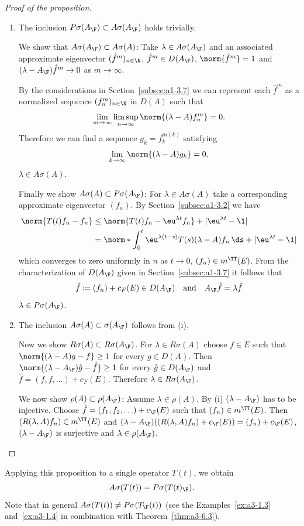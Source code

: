 \begin{proof}[Proof of the proposition]
\begin{enumerate}[\upshape (i), wide, labelindent=.25em]
\item 
The inclusion $P\sigma(A_{\F}) \subset A\sigma(A_{\F})$ holds trivially.

We show that $A\sigma(A_{\F}) \subset A\sigma(A)$: Take $\lambda \in A\sigma(A_{\F})$ and an associated approximate eigenvector $({\hat{f}^{m}})_{n \in \N}$, \ie $\hat{f}^{m} \in D(A_{\F})$, $\norm{\hat{f}^{m}} = 1$ and $(\lambda-A_{\F})\hat{f}^{m} \to 0$ as $m \to \infty$.

By the considerations in Section~\ref{subsec:a1-3.7} we can represent each $\hat{f}^{m}$ as a normalized sequence $(f_{n}^{m})_{n \in \N}$ in $D(A)$ such that
\[
\lim_{m \to \infty} \limsup_{n \to \infty} \norm{(\lambda-A)f_{n}^{m}} = 0 .
\]
Therefore we can find a sequence $g_{k} = f_{k}^{m(k)}$ satisfying
\[
\lim_{k \to \infty} \norm{(\lambda-A)g_{k}} = 0 ,
\]
\ie $\lambda \in A\sigma(A)$.

Finally we show $A\sigma(A) \subset P\sigma(A_{\F})$: For $\lambda \in A\sigma(A)$ take a corresponding approximate eigenvector $(f_{n})$.
By Section~\ref{subsec:a1-3.2} we have
\begin{align*}
\norm{T(t)f_{n} - f_{n}} &\leq \norm{T(t)f_{n} - \eu^{\lambda t}f_{n}} + |\eu^{\lambda t} - \1| \\
&= \norm*{\int_{0}^{t} \eu^{\lambda(t-s)}T(s)(\lambda-A)f_{n} \, \ds} + |\eu^{\lambda t} - \1|
\end{align*}
which converges to zero uniformly in $n$ as $t \to 0$, \ie $(f_{n}) \in m^{\TT}(E)$.
From the characterization of\/ $D(A_{\F})$ given in Section~\ref{subsec:a1-3.7} it follows that
\[
	\hat{f} \coloneqq (f_{n}) + c_{F}(E) \in D(A_{\F})
	\quad \text{and} \quad
	A_{\F}\hat{f} = \lambda\hat{f}
\]
\ie  $\lambda \in P\sigma(A_{\F}) $.

\item 
The inclusion $A\sigma(A) \subset \sigma(A_{\F})$ follows from (i). 

Now we show $R\sigma(A) \subset R\sigma(A_{\F})$.
For $\lambda \in R\sigma(A)$ choose $f \in E$ such that $\norm{(\lambda-A)g - f} \geq 1$ for every $g \in D(A)$.
Then $\norm{(\lambda-A_{\F})\hat{g} - \hat{f}} \geq 1$ for every $\hat{g} \in D(A_{\F})$ and $\hat{f} = (f,f,\ldots) + c_{F}(E)$.
Therefore $\lambda \in R\sigma(A_{\F})$.

We now show $\rho(A) \subset \rho(A_{\F})$: Assume $\lambda \in \rho(A)$.
By (i) $(\lambda-A_{\F})$ has to be injective.
Choose $\hat{f} = (f_{1},f_{2},\ldots) + c_{\F}(E)$ such that $(f_{n}) \in m^{\TT}(E)$.
Then $(R(\lambda,A)f_{n}) \in m^{\TT}(E)$ and $(\lambda-A_{\F})((R(\lambda,A)f_{n})+c_{\F}(E)) = (f_{n}) + c_{\F}(E)$, \ie $(\lambda-A_{\F})$ is surjective and $\lambda \in \rho(A_{\F})$.
\end{enumerate}
\end{proof}
Applying this proposition to a single operator $T(t)$, we obtain
\[
A\sigma(T(t)) = P\sigma(T(t)_{\F}) .
\]
Note that in general $A\sigma(T(t)) \neq P\sigma(T_{\F}(t))$ (see the Examples~\ref{ex:a3-1.3} and~\ref{ex:a3-1.4} in combination with Theorem~\ref{thm:a3-6.3}).
